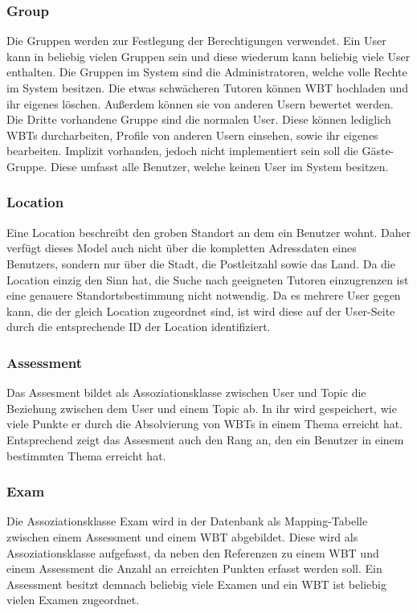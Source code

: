 \subsubsection{Group}
Die Gruppen werden zur Festlegung der Berechtigungen verwendet. Ein User
kann in beliebig vielen Gruppen sein und diese wiederum kann beliebig viele User
enthalten. Die Gruppen im System sind die Administratoren, welche volle Rechte
im System besitzen. Die etwas schwächeren Tutoren können WBT hochladen und ihr
eigenes löschen. Außerdem können sie von anderen Usern bewertet werden. Die
Dritte vorhandene Gruppe sind die normalen User. Diese können lediglich WBTs
durcharbeiten, Profile von anderen Usern einsehen, sowie ihr eigenes bearbeiten.
Implizit vorhanden, jedoch nicht implementiert sein soll die Gäste-Gruppe. Diese
umfasst alle Benutzer, welche keinen User im System besitzen.

\subsubsection{Location}
Eine Location beschreibt den groben Standort an dem ein Benutzer wohnt. Daher
verfügt dieses Model auch nicht über die kompletten Adressdaten eines Benutzers,
sondern nur über die Stadt, die Postleitzahl sowie das Land. Da die Location
einzig den Sinn hat, die Suche nach geeigneten Tutoren einzugrenzen ist eine
genauere Standortsbestimmung nicht notwendig. Da es mehrere User gegen kann, die
der gleich Location zugeordnet sind, ist wird diese auf der User-Seite durch die
entsprechende ID der Location identifiziert. 

\subsubsection{Assessment}
Das Assesment bildet als Assoziationsklasse zwischen User und Topic die
Beziehung zwischen dem User und einem Topic ab. In ihr wird gespeichert, wie
viele Punkte er durch die Absolvierung von WBTs in einem Thema erreicht hat.
Entsprechend zeigt das Assesment auch den Rang an, den ein Benutzer in einem
bestimmten Thema erreicht hat.

\subsubsection{Exam}
Die Assoziationsklasse Exam wird in der Datenbank als Mapping-Tabelle zwischen
einem Assessment und einem WBT abgebildet. Diese wird als Assoziationsklasse
aufgefasst, da neben den Referenzen zu einem WBT und einem Assessment die Anzahl
an erreichten Punkten erfasst werden soll. Ein Assessment besitzt demnach
beliebig viele Examen und ein WBT ist beliebig vielen Examen zugeordnet.

